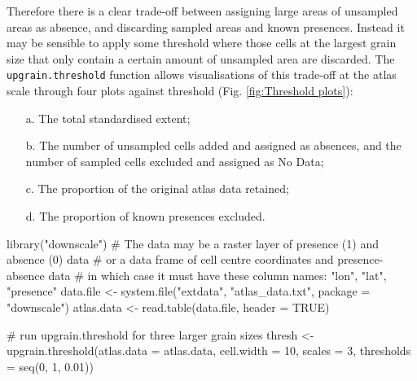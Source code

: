\documentclass{article}[12pt, a4paper]
\begin{document}
Therefore there is a clear trade-off between assigning large areas of unsampled areas as absence, and discarding sampled areas and known presences. Instead it may be sensible to apply some threshold where those cells at the largest grain size that only contain a certain amount of unsampled area are discarded. The \texttt{upgrain.threshold} function allows visualisations of this trade-off at the atlas scale through four plots against threshold (Fig. \ref{fig:Threshold plots}):

\begin{enumerate} \itemsep1pt \parskip0pt 
\item [a.] The total standardised extent;
\item [b.] The number of unsampled cells added and assigned as absences, and the number of sampled cells excluded and assigned as No Data;
\item [c.] The proportion of the original atlas data retained;
\item [d.] The proportion of known presences excluded.
\end{enumerate}

\begin{Schunk}
\begin{Sinput}
library("downscale")
#  The data may be a raster layer of presence (1) and absence (0) data 
#  or a data frame of cell centre coordinates and presence-absence data 
#  in which case it must have these column names: "lon", "lat", "presence"
data.file <- system.file("extdata", "atlas_data.txt", package = "downscale")
atlas.data <- read.table(data.file, header = TRUE)

# run upgrain.threshold for three larger grain sizes
thresh <- upgrain.threshold(atlas.data = atlas.data,
                            cell.width = 10,
                            scales = 3,
                            thresholds = seq(0, 1, 0.01))
\end{Sinput}
\end{Schunk}
                            
\end{document}
